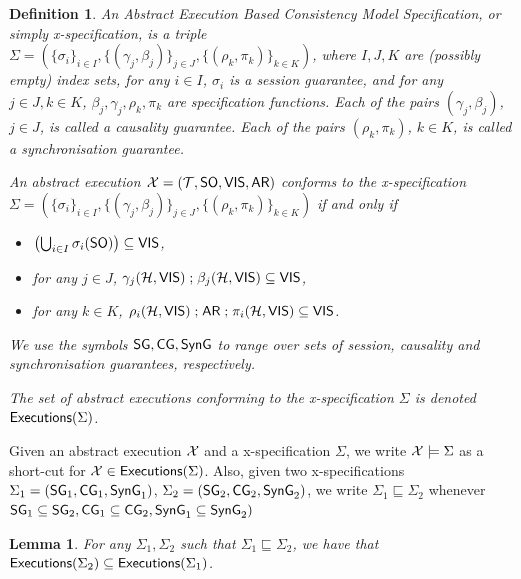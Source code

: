 \documentclass[a4paper,UKenglish]{article}%
\newtheorem{definition}[theorem]{Definition}
\theoremstyle{plain}
\newtheorem{lemma}[thm]{\sc Lemma}
\begin{document}
\begin{definition}
An \emph{Abstract Execution Based Consistency Model Specification}, or simply x-specification, 
is a triple $\Sigma = (\{\sigma_i\}_{i \in I}, \{(\gamma_j, \beta_j)\}_{j \in J}, \{(\rho_k, \pi_k)\}_{k \in K})$, 
where $I, J, K$ are (possibly empty) index sets, for any $i \in I$, $\sigma_i$ is a session guarantee, and 
for any $j \in J, k \in K$, $\beta_j, \gamma_j, \rho_k, \pi_k$ are specification functions. Each 
of the pairs $(\gamma_j, \beta_j)$, $j \in J$, is called a \emph{causality guarantee}. Each of the 
pairs $(\rho_k, \pi_k)$, $k \in K$, is called a \emph{synchronisation guarantee}.

An abstract execution $\mathcal{X} = (\mathcal{T}, {\sf{SO}}, {\mathsf{VIS}}, {\sf{AR}})$ conforms to the x-specification 
$\Sigma = (\{\sigma_i\}_{i \in I}, \{(\gamma_j, \beta_j)\}_{j \in J}, \{(\rho_k, \pi_k)\}_{k \in K})$ 
if and only if 
\begin{itemize}
\item $\left(\bigcup_{i \in I} \sigma_i({\sf{SO}}) \right) \subseteq {\mathsf{VIS}}$, 
\item for any $j \in J$, $\gamma_j(\mathcal{H}, {\mathsf{VIS}}) \mathrel{;} \beta_j(\mathcal{H}, {\mathsf{VIS}}) \subseteq {\mathsf{VIS}}$, 
\item for any $k \in K$, $\rho_i(\mathcal{H}, {\mathsf{VIS}}) \mathrel{;} {\sf{AR}} \mathrel{;} \pi_i(\mathcal{H}, {\mathsf{VIS}}) \subseteq {\mathsf{VIS}}$.
\end{itemize}
We use the symbols $\mathsf{SG}, \mathsf{CG}, \mathsf{SynG}$ to range over sets of session, causality and 
synchronisation guarantees, respectively.

The set of abstract executions conforming to the x-specification $\Sigma$ is denoted 
${\mathsf{Executions}}(\Sigma)$.
\end{definition}
Given an abstract execution $\mathcal{X}$ and a x-specification $\Sigma$, we write 
$\mathcal{X} \models \Sigma$ as a short-cut for 
$\mathcal{X} \in {\mathsf{Executions}}(\Sigma)$. Also, given two x-specifications $\Sigma_1 = (\mathsf{SG}_1, \mathsf{CG}_1, \mathsf{SynG}_1)$, 
$\Sigma_2 = (\mathsf{SG}_2, \mathsf{CG}_2, \mathsf{SynG}_2)$, we write $\Sigma_1 \sqsubseteq \Sigma_2$ 
whenever $\mathsf{SG}_1 \subseteq \mathsf{SG}_2, \mathsf{CG}_1 \subseteq \mathsf{CG}_2, \mathsf{SynG}_1 \subseteq \mathsf{SynG}_2)$
\begin{lemma}
\label{lem:xspec.exec}
For any $\Sigma_1, \Sigma_2$ such that $\Sigma_1 \sqsubseteq \Sigma_2$, 
we have that ${\mathsf{Executions}}(\Sigma_2) \subseteq {\mathsf{Executions}}(\Sigma_1)$.
\end{lemma}
\end{document}
